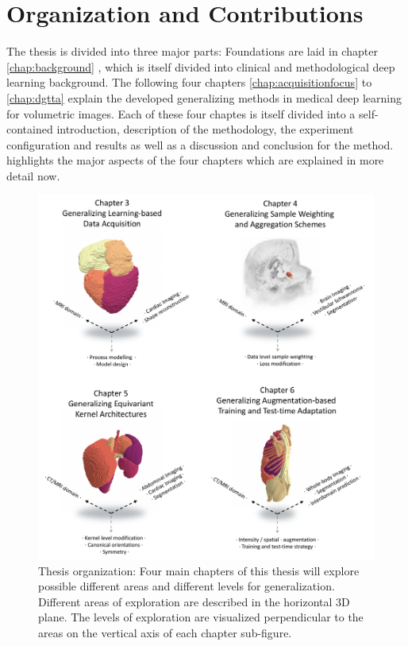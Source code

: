         \section{Organization and Contributions}  %
            \label{sec:organization}
            The thesis is divided into three major parts:
            Foundations are laid in chapter \ref{chap:background} , which is itself divided into clinical and methodological deep learning background.
            The following four chapters \ref{chap:acquisitionfocus} to  \ref{chap:dgtta} explain the developed generalizing methods in medical deep learning for volumetric images. Each of these four chaptes is itself divided into a self-contained introduction, description of the methodology, the experiment configuration and results as well as a discussion and conclusion for the method. %
             highlights the major aspects of the four chapters which are explained in more detail now.

            \begin{figure}
                \includegraphics[width=\textwidth]{sections/01_introduction/figures/draft_areas_levels.pdf}
                \caption{Thesis organization: Four main chapters of this thesis will explore possible different areas and different levels for generalization. Different areas of exploration are described in the horizontal 3D plane. The levels of exploration are visualized perpendicular to the areas on the vertical axis of each chapter sub-figure.}
                \label{fig:draft}
            \end{figure}

